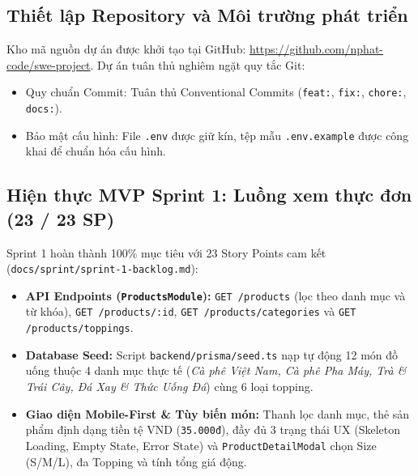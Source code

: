 \documentclass[a4paper,12pt]{article}
\begin{document}
\subsection{Thiết lập Repository và Môi trường phát triển}
Kho mã nguồn dự án được khởi tạo tại GitHub: \url{https://github.com/nphat-code/swe-project}. Dự án tuân thủ nghiêm ngặt quy tắc Git:
\begin{itemize}
  \item Quy chuẩn Commit: Tuân thủ Conventional Commits (\texttt{feat:}, \texttt{fix:}, \texttt{chore:}, \texttt{docs:}).
  \item Bảo mật cấu hình: File \texttt{.env} được giữ kín, tệp mẫu \texttt{.env.example} được công khai để chuẩn hóa cấu hình.
\end{itemize}

\subsection{Hiện thực MVP Sprint 1: Luồng xem thực đơn (23 / 23 SP)}
Sprint 1 hoàn thành 100\% mục tiêu với 23 Story Points cam kết (\texttt{docs/sprint/sprint-1-backlog.md}):
\begin{itemize}
  \item \textbf{API Endpoints (\texttt{ProductsModule}):} \texttt{GET /products} (lọc theo danh mục và từ khóa), \texttt{GET /products/:id}, \texttt{GET /products/categories} và \texttt{GET /products/toppings}.
  \item \textbf{Database Seed:} Script \texttt{backend/prisma/seed.ts} nạp tự động 12 món đồ uống thuộc 4 danh mục thực tế (\textit{Cà phê Việt Nam, Cà phê Pha Máy, Trà \& Trái Cây, Đá Xay \& Thức Uống Đá}) cùng 6 loại topping.
  \item \textbf{Giao diện Mobile-First \& Tùy biến món:} Thanh lọc danh mục, thẻ sản phẩm định dạng tiền tệ VND (\texttt{35.000đ}), đầy đủ 3 trạng thái UX (Skeleton Loading, Empty State, Error State) và \texttt{ProductDetailModal} chọn Size (S/M/L), đa Topping và tính tổng giá động.
\end{itemize}
\end{document}
